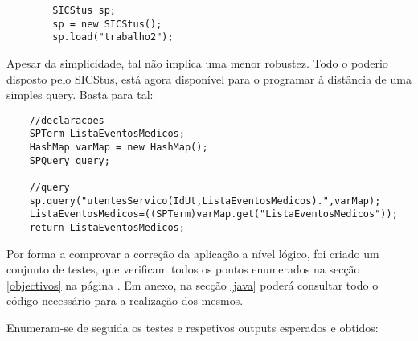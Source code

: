 \documentclass[
  oneside,
  10pt, a4paper,
  footinclude=true,
  headinclude=true,
  cleardoublepage=empty
]{scrbook}
\begin{document}
\begin{lstlisting}
        SICStus sp;
        sp = new SICStus();
        sp.load("trabalho2");
\end{lstlisting}

\par
Apesar da simplicidade, tal não implica uma menor robustez. Todo o poderio disposto pelo SICStus, está agora disponível para o programar à distância de uma simples query. Basta para tal:
\par

\begin{lstlisting}
    //declaracoes
    SPTerm ListaEventosMedicos;
    HashMap varMap = new HashMap();
    SPQuery query;

    //query
    sp.query("utentesServico(IdUt,ListaEventosMedicos).",varMap);
    ListaEventosMedicos=((SPTerm)varMap.get("ListaEventosMedicos"));
    return ListaEventosMedicos;
\end{lstlisting}


\par
Por forma a comprovar a correção da aplicação a nível lógico, foi criado um conjunto de testes, que verificam todos os pontos enumerados na secção \ref{objectivos} na página \pageref{objectivos}. Em anexo, na secção \ref{java} poderá consultar todo o código necessário para a realização dos mesmos.\par  Enumeram-se de seguida os testes e respetivos outputs esperados e obtidos:
\end{document}
